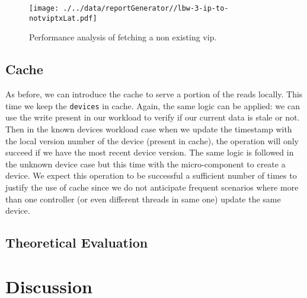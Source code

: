 \begin{figure}[ht]
\centering
\texttt{[image: ./../data/reportGenerator//lbw-3-ip-to-notviptxLat.pdf]}
\caption[Minimum impact of Load Balancer in the pipeline.]{Performance analysis of fetching a non existing \gls{vip}. }\label{fig:lb:minimal}
\end{figure}

\subsection{Cache}
As before, we can introduce the cache to serve a portion of the reads locally. 
This time we keep the \texttt{devices} in cache. 
Again, the same logic  can be applied: we can use the write present in our workload to verify if our current data is stale or not.  Then in the known devices workload case when we update the timestamp with the local version number of the device (present in cache), the operation will only succeed if we have the most recent device version. 
The same logic is followed in the unknown device case but this time with the micro-component to create a device. 
We expect this operation to be successful a sufficient number of times to justify the use of cache since we do not anticipate frequent scenarios where more than one controller (or even different threads in same one) update the same device. 

\subsection{Theoretical Evaluation}

\section{Discussion}

